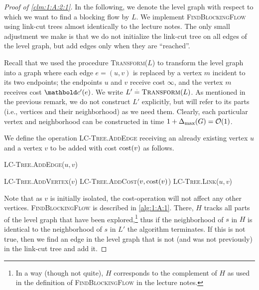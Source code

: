 \documentclass[nobib]{tufte-handout}
\begin{document}
\begin{proof}[Proof of \cref{clm:1:A:2:1}]
In the following, we denote the level graph with respect to which we want to find a blocking flow by $L$. We implement \textsc{FindBlockingFlow} using link-cut trees almost identically to the lecture notes. The only small adjustment we make is that we do not initialize the link-cut tree on all edges of the level graph, but add edges only when they are ``reached''.

Recall that we used the procedure \textsc{Transform($L$)} to transform the level graph into a graph where each edge $e = (u,v)$ is replaced by a vertex $m$ incident to its two endpoints; the endpoints $u$ and $v$ receive cost $\infty$, and the vertex $m$ receives cost $\vc'(e)$. We write $L' \overset{.}{=} \textsc{Transform}(L)$. As mentioned in the previous remark, we do not construct $L'$ explicitly, but will refer to its parts (i.e., vertices and their neighborhood) as we need them. Clearly, each particular vertex and neighborhood can be constructed in time $1 + \Delta_{\max}(G) = \LandauO{1}$.

We define the operation \textsc{LC-Tree.AddEdge} receiving an already existing vertex $u$ and a vertex $v$ to be added with cost $\mathrm{cost}(v)$ as follows.

\begin{algorithm}[H]
    \caption{\textsc{LC-Tree.AddEdge($u, v$)}}
    \textsc{LC-Tree.AddVertex}($v$)\;
    \textsc{LC-Tree.AddCost($v, \mathrm{cost}(v)$)}\;
    \textsc{LC-Tree.Link($u, v$)}\;
\end{algorithm}

Note that as $v$ is initially isolated, the cost-operation will not affect any other vertices. \textsc{FindBlockingFlow} is described in \cref{alg:1:A:1}. There, $H$ tracks all parts of the level graph that have been explored,\footnote{In a way (though not quite), $H$ corresponds to the complement of $H$ as used in the definition of \textsc{FindBlockingFlow} in the lecture notes.} thus if the neighborhood of $s$ in $H$ is identical to the neighborhood of $s$ in $L'$ the algorithm terminates. If this is not true, then we find an edge in the level graph that is not (and was not previously) in the link-cut tree and add it.


\end{proof}
\end{document}
